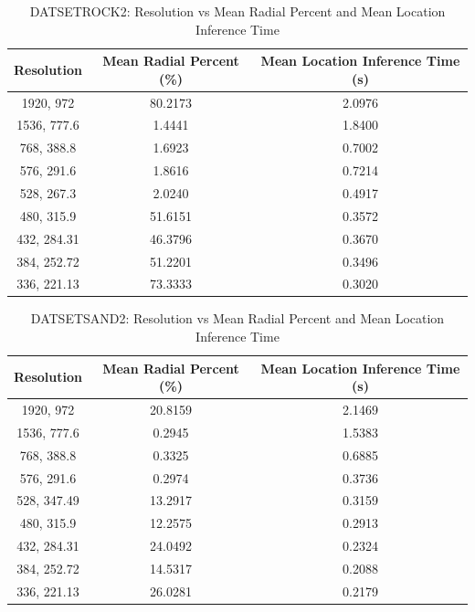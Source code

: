 \begin{table}[H]
\centering
\begin{tabular}{|c|c|c|}
\hline
\textbf{Resolution} & \textbf{Mean Radial Percent (\%)} & \textbf{Mean Location Inference Time (s)} \\
\hline
1920, 972 & 80.2173 & 2.0976 \\
1536, 777.6 & 1.4441 & 1.8400 \\
768, 388.8 & 1.6923 & 0.7002 \\
576, 291.6 & 1.8616 & 0.7214 \\
528, 267.3 & 2.0240 & 0.4917 \\
480, 315.9 & 51.6151 & 0.3572 \\
432, 284.31 & 46.3796 & 0.3670 \\
384, 252.72 & 51.2201 & 0.3496 \\
336, 221.13 & 73.3333 & 0.3020 \\
\hline
\end{tabular}
\caption{DATSETROCK2: Resolution vs Mean Radial Percent and Mean Location Inference Time}
\label{tab:datsetrock2}
\end{table}

\begin{table}[H]
\centering
\begin{tabular}{|c|c|c|}
\hline
\textbf{Resolution} & \textbf{Mean Radial Percent (\%)} & \textbf{Mean Location Inference Time (s)} \\
\hline
1920, 972 & 20.8159 & 2.1469 \\
1536, 777.6 & 0.2945 & 1.5383 \\
768, 388.8 & 0.3325 & 0.6885 \\
576, 291.6 & 0.2974 & 0.3736 \\
528, 347.49 & 13.2917 & 0.3159 \\
480, 315.9 & 12.2575 & 0.2913 \\
432, 284.31 & 24.0492 & 0.2324 \\
384, 252.72 & 14.5317 & 0.2088 \\
336, 221.13 & 26.0281 & 0.2179 \\
\hline
\end{tabular}
\caption{DATSETSAND2: Resolution vs Mean Radial Percent and Mean Location Inference Time}
\label{tab:datsetsand2}
\end{table}


